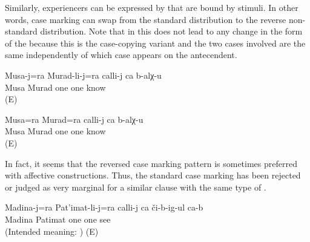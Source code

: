 Similarly, experiencers can be expressed by  that are bound by  stimuli. In other words, case marking can swap from the standard distribution to the reverse non-standard distribution. Note that in  this does not lead to any change in the form of the  because this is the case-copying variant and the two cases involved are the same independently of which case appears on the antecendent.
%
\begin{exe}
	\ex	\label{ex:Musa and Murad know each other}
	\begin{xlist}
		\ex	\label{ex:Musa and Murad know each other@A}
		\gll	Musa-j=ra	Murad-li-j=ra	calli-j	ca	b-alχ-u\\
			Musa	Murad	one	one	know\\
		\glt	{} (E)

		\ex	\label{ex:Musa and Murad know each other@B}
		\gll	Musa=ra	Murad=ra	calli-j	ca	b-alχ-u\\
			Musa\tsc{=add}	Murad	one	one	know\\
		\glt	{} (E)
	\end{xlist}
\end{exe}

In fact, it seems that the reversed case marking pattern is sometimes preferred with affective constructions. Thus, the standard case marking has been rejected or judged as very marginal for a similar clause with the same type of  .
%
\begin{exe}
	\ex	\label{ex:Madina and Patimat see each other uncertain@14}
		Madina-j=ra	Pat'imat-li-j=ra	calli-j	ca	či-b-ig-ul	ca-b\\
		{}	Madina	Patimat	one	one	see	\\
	\glt	(Intended meaning: ) (E)
\end{exe}

